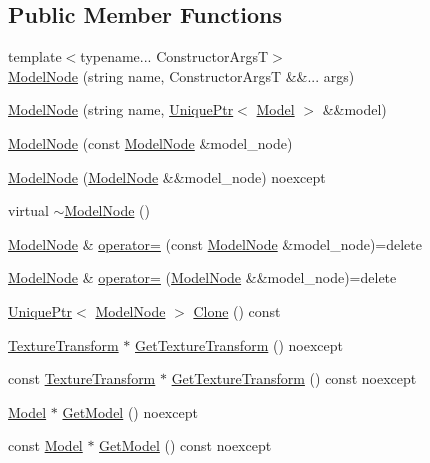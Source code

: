 \subsection*{Public Member Functions}
\begin{DoxyCompactItemize}
\item 
{\footnotesize template$<$typename... Constructor\+ArgsT$>$ }\\\hyperlink{classmage_1_1_model_node_a588aa714637e3e17e764e08c9035bf60}{Model\+Node} (string name, Constructor\+ArgsT \&\&... args)
\item 
\hyperlink{classmage_1_1_model_node_a46f63c13878130126a4b25fdb568ac37}{Model\+Node} (string name, \hyperlink{namespacemage_a3316d7143a973e37adf1110f2e80ca31}{Unique\+Ptr}$<$ \hyperlink{classmage_1_1_model}{Model} $>$ \&\&model)
\item 
\hyperlink{classmage_1_1_model_node_a409c098ddecf20d1b393d43c15d16482}{Model\+Node} (const \hyperlink{classmage_1_1_model_node}{Model\+Node} \&model\+\_\+node)
\item 
\hyperlink{classmage_1_1_model_node_a1e900787d894c25ffb7e71456e44c03b}{Model\+Node} (\hyperlink{classmage_1_1_model_node}{Model\+Node} \&\&model\+\_\+node) noexcept
\item 
virtual \hyperlink{classmage_1_1_model_node_a131c0062a1bed3d29fade27e602bec44}{$\sim$\+Model\+Node} ()
\item 
\hyperlink{classmage_1_1_model_node}{Model\+Node} \& \hyperlink{classmage_1_1_model_node_ad8378279b79930dfe98d176dbc1c5db9}{operator=} (const \hyperlink{classmage_1_1_model_node}{Model\+Node} \&model\+\_\+node)=delete
\item 
\hyperlink{classmage_1_1_model_node}{Model\+Node} \& \hyperlink{classmage_1_1_model_node_ad39321f4d392aa4e28169b8d7a08af68}{operator=} (\hyperlink{classmage_1_1_model_node}{Model\+Node} \&\&model\+\_\+node)=delete
\item 
\hyperlink{namespacemage_a3316d7143a973e37adf1110f2e80ca31}{Unique\+Ptr}$<$ \hyperlink{classmage_1_1_model_node}{Model\+Node} $>$ \hyperlink{classmage_1_1_model_node_a766f90e1d626c455ba552a3ded08b948}{Clone} () const
\item 
\hyperlink{classmage_1_1_texture_transform}{Texture\+Transform} $\ast$ \hyperlink{classmage_1_1_model_node_aa5b732d1ad0f3d2ff8549731708fd63c}{Get\+Texture\+Transform} () noexcept
\item 
const \hyperlink{classmage_1_1_texture_transform}{Texture\+Transform} $\ast$ \hyperlink{classmage_1_1_model_node_a3686306f587abaa353450c45dd508dc4}{Get\+Texture\+Transform} () const noexcept
\item 
\hyperlink{classmage_1_1_model}{Model} $\ast$ \hyperlink{classmage_1_1_model_node_a8964223fd592fd23949d6f996c40a482}{Get\+Model} () noexcept
\item 
const \hyperlink{classmage_1_1_model}{Model} $\ast$ \hyperlink{classmage_1_1_model_node_ad8c4978c4d14ed015fdb517ba86ebd93}{Get\+Model} () const noexcept
\end{DoxyCompactItemize}
